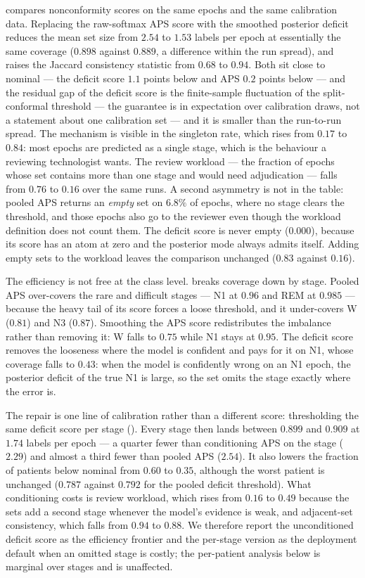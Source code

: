  compares nonconformity scores on the same epochs and the
same calibration data. Replacing the raw-softmax APS score with the smoothed
posterior deficit reduces the mean set size from $2.54$ to $1.53$ labels per
epoch at essentially the same coverage ($0.898$ against $0.889$, a difference
within the run spread), and raises the Jaccard consistency statistic from
$0.68$ to $0.94$. Both sit close to nominal --- the deficit score $1.1$ points
below and APS $0.2$ points below --- and the residual gap of
the deficit score is the finite-sample fluctuation of the split-conformal
threshold --- the guarantee is in expectation over calibration draws, not a
statement about one calibration set --- and it is smaller than the
run-to-run spread. The mechanism is visible in the singleton rate, which rises
from $0.17$ to $0.84$: most epochs are predicted as a single stage, which is
the behaviour a reviewing technologist wants. The review workload --- the
fraction of epochs whose set contains more than one stage and would need
adjudication --- falls from $0.76$ to $0.16$ over the same runs. A second
asymmetry is not in the table: pooled APS returns an \emph{empty} set on
$6.8\%$ of epochs, where no stage clears the threshold, and those epochs also
go to the reviewer even though the workload definition does not count them.
The deficit score is never empty ($0.000$), because its score has an atom at
zero and the posterior mode always admits itself. Adding empty sets to the
workload leaves the comparison unchanged ($0.83$ against $0.16$).

The efficiency is not free at the class level.  breaks
coverage down by stage. Pooled APS over-covers the rare and difficult stages
--- N1 at $0.96$ and REM at $0.985$ --- because the heavy tail of its score
forces a loose threshold, and it under-covers W ($0.81$) and N3 ($0.87$).
Smoothing the APS score redistributes the imbalance rather than removing it:
W falls to $0.75$ while N1 stays at $0.95$. The deficit score removes the
looseness where the model is confident and pays for
it on N1, whose coverage falls to $0.43$: when the model is confidently wrong
on an N1 epoch, the posterior deficit of the true N1 is large, so the set
omits the stage exactly where the error is.

The repair is one line of calibration rather than a different score:
thresholding the same deficit score per stage (). Every
stage then lands between $0.899$ and $0.909$ at $1.74$ labels per epoch --- a
quarter fewer than conditioning APS on the stage ($2.29$) and almost a third
fewer than pooled APS ($2.54$). It also lowers the fraction of patients below
nominal from $0.60$ to $0.35$, although the worst patient is unchanged
($0.787$ against $0.792$ for the pooled deficit threshold). What conditioning costs is review
workload, which rises from $0.16$ to $0.49$ because the sets add a second
stage whenever the model's evidence is weak, and adjacent-set consistency,
which falls from $0.94$ to $0.88$. We therefore report the unconditioned
deficit score as the efficiency frontier and the per-stage version as the
deployment default when an omitted stage is costly; the per-patient analysis
below is marginal over stages and is unaffected.

